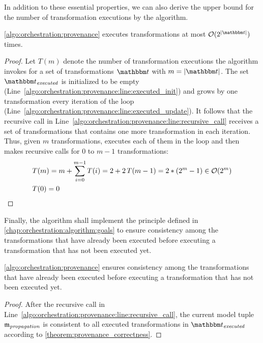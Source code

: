 In addition to these essential properties, we can also derive the upper bound for the number of transformation executions by the algorithm.

\begin{theorem}
    \autoref{algo:orchestration:provenance} executes transformations at most $\mathcal{O}(2^{\abs{\transformationset{T}}})$ times.
\end{theorem}
\begin{proof}
	Let $T(m)$ denote the number of transformation executions the algorithm invokes for a set of transformations $\transformationset{T}$ with $m = \abs{\transformationset{T}}$.
	The set $\provalgexecuted$ is initialized to be empty (Line~\ref{algo:orchestration:provenance:line:executed_init}) and grows by one transformation every iteration of the loop (Line~\ref{algo:orchestration:provenance:line:executed_update}).
    It follows that the recursive call in Line~\ref{algo:orchestration:provenance:line:recursive_call} receives a set of transformations that contains one more transformation in each iteration.
    Thus, given $m$ transformations,  executes each of them in the loop and then makes recursive calls for $0$ to $m-1$ transformations:
    \begin{align*}
        &
    T(m)	=m+\sum_{i=0}^{m-1}T(i)
    	=2+2\,T(m-1)
        =2*(2^{m}-1) \in \mathcal{O}(2^m) \\
        &
    T(0)	=0 \qedhere
	\end{align*}
\end{proof}

Finally, the algorithm shall implement the principle defined in \autoref{chap:orchestration:algorithm:goals} to ensure consistency among the transformations that have already been executed before executing a transformation that has not been executed yet.

\begin{theorem}
    \autoref{algo:orchestration:provenance} ensures consistency among the transformations that have already been executed before executing a transformation that has not been executed yet.
\end{theorem}
\begin{proof}
	After the recursive call in Line~\ref{algo:orchestration:provenance:line:recursive_call}, the current model tuple $\modeltuple{m}_{\mathvariable{propagation}}$ is consistent to all executed transformations in $\provalgexecuted$ according to \autoref{theorem:provenance_correctness}. %
\end{proof}	

